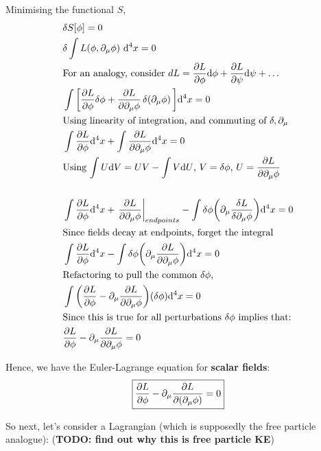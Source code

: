 Minimising the functional $S$,
\begin{align*}
    &\delta S[\phi] = 0 \\
    & \delta \int L(\phi, \partial_\mu \phi)~\dd^4x = 0 \\
    &\text{For an analogy, consider $dL = \pdv{L}{\phi} \dd \phi + \pdv{L}{\psi} \dd \psi + \dots$} \\
    & \int \bigg[\pdv{L}{\phi} \var \phi + 
    \pdv{L}{\partial_\mu \phi} \var (\partial_\mu \phi) \bigg] \dd^4 x  = 0\\
    &\text{Using linearity of integration, and commuting of $\delta, \partial_\mu$}\\
    & \int \pdv{L}{\phi} (\var \phi) \dd^4 x + 
      \int \pdv{L}{\partial_\mu \phi}  (\partial_\mu \var \phi) \dd^4 x = 0 \\
    &\text{Using $\int U \dd V = UV - \int V \dd U$, 
        $V = \delta \phi$, 
    $U = \pdv{L}{\partial_\mu \phi}$ } \\
    \\
    & \int \pdv{L}{\phi} (\var \phi) \dd^4 x + 
       \eval{\pdv{L}{\partial_\mu \phi}  (\var \phi)}_{endpoints} 
      -  \int \delta \phi \bigg(\partial_\mu \fdv{L}{\partial_\mu \phi} \bigg) \dd^4 x  = 0\\
  &\text{Since fields decay at endpoints, forget the integral} \\
  & \int \pdv{L}{\phi} (\var \phi) \dd^4 x  
  -  \int \delta \phi \bigg(\partial_\mu \pdv{L}{\partial_\mu \phi} \bigg) \dd^4 x = 0\\
  &\text{Refactoring to pull the common $\delta \phi$,}\\
  & \int \bigg(\pdv{L}{\phi} -  \partial_\mu \pdv{L}{\partial_\mu \phi} \bigg) (\var \phi) \dd^4 x  = 0 \\
  & \text{Since this is true for all perturbations $\delta \phi$ implies that:} \\
  &\pdv{L}{\phi} -  \partial_\mu \pdv{L}{\partial_\mu \phi} = 0
\end{align*}


Hence, we have the Euler-Lagrange equation for \textbf{scalar fields}:
\begin{equation}
    \boxed{\pdv{L}{\phi} -  \partial_\mu \pdv{L}{(\partial_\mu \phi)} = 0} 
\end{equation}

So next, let's consider a Lagrangian (which is supposedly the free particle
analogue):
(\textbf{TODO: find out why this is free particle KE})

